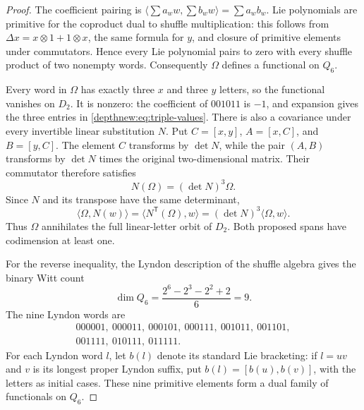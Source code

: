 \begin{proof}
The coefficient pairing is
$\langle\sum a_ww,\sum b_ww\rangle=\sum a_wb_w$.
Lie polynomials are primitive for the coproduct dual to shuffle
multiplication: this follows from
$\Delta x=x\otimes1+1\otimes x$, the same formula for $y$, and closure
of primitive elements under commutators. Hence every Lie polynomial
pairs to zero with every shuffle product of two nonempty words.
Consequently $\Omega$ defines a functional on $Q_6$.

Every word in $\Omega$ has exactly three $x$ and three $y$ letters,
so the functional vanishes on $D_2$. It is nonzero: the coefficient
of $001011$ is $-1$, and expansion gives the three entries in
\eqref{depthnew:eq:triple-values}.
There is also a covariance under every invertible linear substitution
$N$. Put $C=[x,y]$, $A=[x,C]$, and $B=[y,C]$.
The element $C$ transforms by $\det N$, while the pair $(A,B)$
transforms by $\det N$ times the original two-dimensional matrix.
Their commutator therefore satisfies
\begin{equation}\label{depthnew:eq:covariance}
 N(\Omega)=(\det N)^3\Omega.
\end{equation}
Since $N$ and its transpose have the same determinant,
\[
 \langle\Omega,N(w)\rangle
 =\langle N^{\mathsf T}(\Omega),w\rangle
 =(\det N)^3\langle\Omega,w\rangle.
\]
Thus $\Omega$ annihilates the full linear-letter orbit of $D_2$.
Both proposed spans have codimension at least one.

For the reverse inequality, the Lyndon description of the shuffle
algebra \cite{depthnew:Radford} gives the binary Witt count
\[
 \dim Q_6=\frac{2^6-2^3-2^2+2}{6}=9.
\]
The nine Lyndon words are
\[
\begin{gathered}
000001,\ 000011,\ 000101,\ 000111,\ 001011,\ 001101,\\
001111,\ 010111,\ 011111.
\end{gathered}
\]
For each Lyndon word $l$, let $b(l)$ denote its standard Lie bracketing:
if $l=uv$ and $v$ is its longest proper Lyndon suffix, put
$b(l)=[b(u),b(v)]$, with the letters as initial cases.
These nine primitive elements form a dual family of functionals on $Q_6$.


\end{proof}
